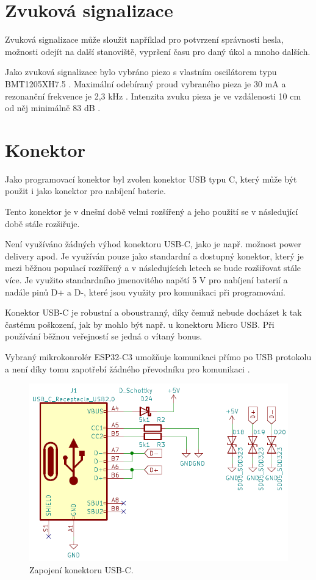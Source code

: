 \section{Zvuková signalizace}
Zvuková signalizace může sloužit například pro potvrzení správnosti hesla, možnosti odejít na další stanoviště, vypršení času pro daný úkol a mnoho dalších. 

Jako zvuková signalizace bylo vybráno piezo s vlastním oscilátorem typu \\BMT1205XH7.5 \cite{piezo_dtsh}. Maximální odebíraný proud vybraného pieza je 30 mA a rezonanční frekvence 
je 2,3 kHz \cite{piezo_dtsh}. Intenzita zvuku pieza je ve vzdálenosti 10 cm od něj minimálně 83 dB \cite{piezo_dtsh}.

\section{Konektor}
Jako programovací konektor byl zvolen konektor USB typu C, který může být použit i jako konektor pro nabíjení baterie.

Tento konektor je v dnešní době velmi rozšířený a jeho použití se v následující době stále rozšiřuje. 

Není využíváno žádných výhod konektoru USB-C, jako je např. možnost power delivery apod. Je využíván pouze jako standardní a dostupný konektor, který je mezi běžnou
populací rozšířený a v následujících letech se bude rozšiřovat stále více. Je využito standardního jmenovitého napětí 5 V pro nabíjení baterií a nadále pinů D+ a D-, 
které jsou využity pro komunikaci při programování. 

Konektor USB-C je robustní a oboustranný, díky čemuž nebude docházet k tak častému poškození, jak by mohlo být např. u konektoru Micro USB. Při používání běžnou veřejností
se jedná o vítaný bonus. 

Vybraný mikrokonrolér ESP32-C3 umožňuje komunikaci přímo po USB protokolu a není díky tomu zapotřebí žádného převodníku pro komunikaci \cite{ESP_C3_dtsh}. %

\begin{figure}[!h]
  \begin{center}
    \includegraphics[scale=0.6]{obrazky/USB_C.png}
  \end{center}
  \caption[Zapojení konektoru USB-C]{Zapojení konektoru USB-C.}
\end{figure}

